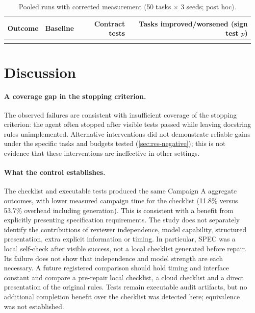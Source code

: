 \documentclass[11pt]{article}
\begin{document}
\begin{table}[tb]
\centering\small
\caption{Pooled runs with corrected measurement (50 tasks $\times$ 3 seeds; post hoc).}\label{tab:pooled}
\begin{tabularx}{\linewidth}{@{}Lrrr@{}}
\toprule
Outcome & Baseline & Contract tests & Tasks improved/worsened (sign test $p$) \\
\midrule
{}
\bottomrule
\end{tabularx}
\end{table}

\section{Discussion}\label{sec:discussion}
\paragraph{A coverage gap in the stopping criterion.} The observed failures are consistent with insufficient coverage of the stopping criterion: the agent often stopped after visible tests passed while leaving docstring rules unimplemented. Alternative interventions did not demonstrate reliable gains under the specific tasks and budgets tested (\cref{sec:res-negative}); this is not evidence that these interventions are ineffective in other settings.

\paragraph{What the control establishes.} The checklist and executable tests produced the same Campaign A aggregate outcomes, with lower measured campaign time for the checklist (11.8\% versus 53.7\% overhead including generation). This is consistent with a benefit from explicitly presenting specification requirements. The study does not separately identify the contributions of reviewer independence, model capability, structured presentation, extra explicit information or timing. In particular, SPEC was a local self-check after visible success, not a local checklist generated before repair. Its failure does not show that independence and model strength are each necessary. A future registered comparison should hold timing and interface constant and compare a pre-repair local checklist, a cloud checklist and a direct presentation of the original rules. Tests remain executable audit artifacts, but no additional completion benefit over the checklist was detected here; equivalence was not established.
\end{document}
